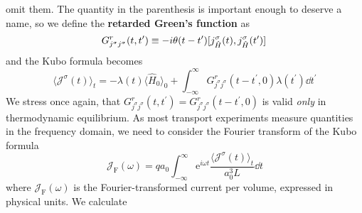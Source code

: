 omit them. The quantity in the parenthesis is important enough to deserve a name, so we define
the \textbf{retarded Green's function} as
\begin{equation}
    G^r_{j^{\sigma }j^{\sigma}}(t,t^{\prime} ) \equiv  -i \theta (t-t^{\prime} ) \comm*{j^{\sigma }_{\hat{H} }(t )} {j^{\sigma}_{\hat{H}}(t^{\prime} ) }
\end{equation}
and the Kubo formula becomes
\begin{equation}
    \langle \mathcal{J}^{\sigma }(t) \rangle_t = -\lambda(t) \langle \hat{H} _0 \rangle_0 + \int_{-\infty}^{\infty }  G^r_{j^{\sigma }j^{\sigma}}(t-t^{\prime},0 ) \lambda (t^{\prime} ) \dd{t^{\prime} } 
\end{equation}
We stress once again, that \(G^r_{j^{\sigma }j^{\sigma }}(t,t^{\prime} ) = G^r_{j^{\sigma }j^{\sigma }}(t-t^{\prime},0 ) \)
is valid \textit{only} in thermodynamic equilibrium.
As most transport experiments measure quantities in the frequency domain,
we need to consider the Fourier transform of the Kubo formula
\begin{equation}
    \mathcal{J}_{\text{F} }(\omega ) = q a_0 \int_{-\infty}^{\infty } \mathrm{e}^{i \omega t} \frac{\langle \mathcal{J}^{\sigma }(t) \rangle_t}{a_0^3 L}\dd{t} 
\end{equation}
where \(\mathcal{J}_{\text{F} }(\omega )\) is the Fourier-transformed current per volume, expressed in physical units.
We calculate
